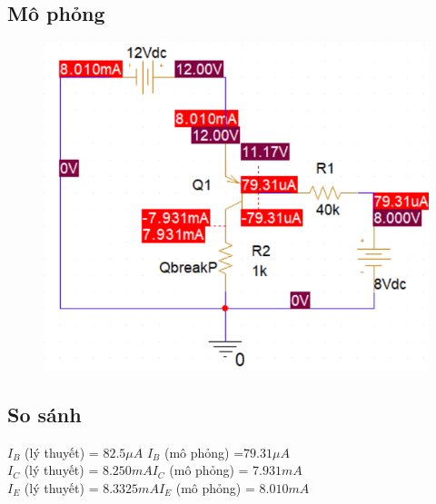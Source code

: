\subsection{Mô phỏng}
\begin{figure}[H]
    \centering
    \includegraphics[width=0.9\linewidth]{graphics/ex6/f2.png}
\end{figure}

\subsection{So sánh}
$I_B$ (lý thuyết) = \dotfill$82.5 \mu A$ \dotfill $I_B$ (mô phỏng) =\dotfill $79.31 \mu A$\dotfill\bigskip\\
$I_C$ (lý thuyết) = \dotfill$ 8.250 mA$\dotfill $I_C$ (mô phỏng) = \dotfill $7.931mA$\dotfill\bigskip\\
$I_E$ (lý thuyết) = \dotfill$8.3325 mA$\dotfill $I_E$ (mô phỏng) = \dotfill$8.010mA $\dotfill\bigskip\\
